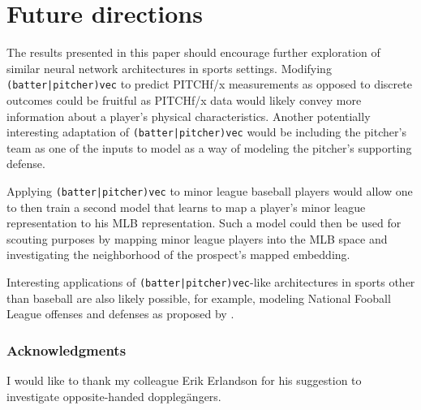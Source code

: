\documentclass{article}
\begin{document}
\section{Future directions}
\label{future}

The results presented in this paper should encourage further exploration of similar neural network architectures in sports settings. Modifying \texttt{(batter|pitcher)vec} to predict PITCHf/x measurements as opposed to discrete outcomes could be fruitful as PITCHf/x data would likely convey more information about a player's physical characteristics. Another potentially interesting adaptation of \texttt{(batter|pitcher)vec} would be including the pitcher's team as one of the inputs to model as a way of modeling the pitcher's supporting defense.

Applying \texttt{(batter|pitcher)vec} to minor league baseball players would allow one to then train a second model that learns to map a player's minor league representation to his MLB representation. Such a model could then be used for scouting purposes by mapping minor league players into the MLB space and investigating the neighborhood of the prospect's mapped embedding.

Interesting applications of \texttt{(batter|pitcher)vec}-like architectures in sports other than baseball are also likely possible, for example, modeling National Fooball League offenses and defenses as proposed by \parencite{Alcorn2016}.

\subsubsection*{Acknowledgments}

I would like to thank my colleague Erik Erlandson for his suggestion to investigate opposite-handed dopplegängers.

\printbibliography
\end{document}
